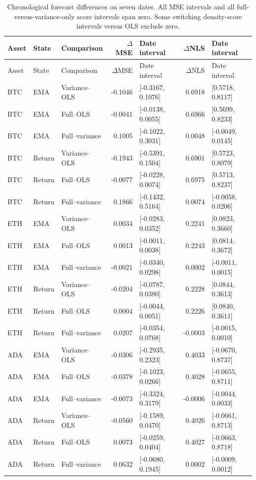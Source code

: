 {\footnotesize
\begin{longtable}{lllrlrl}
\caption{Chronological forecast differences on seven dates. All MSE intervals and all full-versus-variance-only score intervals span zero. Some switching density-score intervals versus OLS exclude zero.}\label{tab:regime_market_rebuilt}\\
\toprule Asset & State & Comparison & $\Delta$MSE & Date interval & $\Delta$NLS & Date interval\\\midrule\endfirsthead
\toprule Asset & State & Comparison & $\Delta$MSE & Date interval & $\Delta$NLS & Date interval\\\midrule\endhead
\bottomrule\endfoot
BTC & EMA & Variance--OLS & -0.1046 & [-0.3167, 0.1076] & 0.6918 & [0.5718, 0.8117]\\
BTC & EMA & Full--OLS & -0.0041 & [-0.0138, 0.0055] & 0.6966 & [0.5699, 0.8233]\\
BTC & EMA & Full--variance & 0.1005 & [-0.1022, 0.3031] & 0.0048 & [-0.0049, 0.0145]\\
BTC & Return & Variance--OLS & -0.1943 & [-0.5391, 0.1504] & 0.6901 & [0.5723, 0.8079]\\
BTC & Return & Full--OLS & -0.0077 & [-0.0228, 0.0074] & 0.6975 & [0.5713, 0.8237]\\
BTC & Return & Full--variance & 0.1866 & [-0.1432, 0.5164] & 0.0074 & [-0.0058, 0.0206]\\
ETH & EMA & Variance--OLS & 0.0034 & [-0.0283, 0.0352] & 0.2241 & [0.0823, 0.3660]\\
ETH & EMA & Full--OLS & 0.0013 & [-0.0011, 0.0038] & 0.2243 & [0.0814, 0.3672]\\
ETH & EMA & Full--variance & -0.0021 & [-0.0340, 0.0298] & 0.0002 & [-0.0011, 0.0015]\\
ETH & Return & Variance--OLS & -0.0204 & [-0.0787, 0.0380] & 0.2228 & [0.0844, 0.3613]\\
ETH & Return & Full--OLS & 0.0004 & [-0.0044, 0.0051] & 0.2226 & [0.0840, 0.3611]\\
ETH & Return & Full--variance & 0.0207 & [-0.0354, 0.0768] & -0.0003 & [-0.0015, 0.0010]\\
ADA & EMA & Variance--OLS & -0.0306 & [-0.2935, 0.2323] & 0.4033 & [-0.0670, 0.8737]\\
ADA & EMA & Full--OLS & -0.0378 & [-0.1023, 0.0266] & 0.4028 & [-0.0655, 0.8711]\\
ADA & EMA & Full--variance & -0.0073 & [-0.3324, 0.3179] & -0.0006 & [-0.0044, 0.0033]\\
ADA & Return & Variance--OLS & -0.0560 & [-0.1589, 0.0470] & 0.4026 & [-0.0661, 0.8713]\\
ADA & Return & Full--OLS & 0.0073 & [-0.0259, 0.0404] & 0.4027 & [-0.0663, 0.8718]\\
ADA & Return & Full--variance & 0.0632 & [-0.0680, 0.1945] & 0.0002 & [-0.0009, 0.0012]\\
\end{longtable}
}

